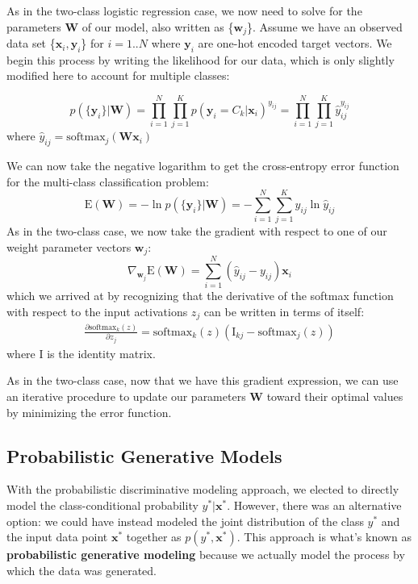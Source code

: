 As in the two-class logistic regression case, we now need to solve for the parameters \textbf{W} of our model, also written as \{$\textbf{w}_{j}$\}. Assume we have an observed data set \{$\textbf{x}_{i}, \textbf{y}_{i}$\} for $i=1..N$ where $\textbf{y}_{i}$ are one-hot encoded target vectors.  We begin this process by writing the likelihood for our data, which is only slightly modified here to account for multiple classes:

\begin{equation} \label{multi-class-log-reg-likelihood}
	p(\{\textbf{y}_{i}\}|\textbf{W}) = \prod_{i=1}^{N}\prod_{j=1}^{K} p(\textbf{y}_{i}=C_{k}|\textbf{x}_{i})^{y_{ij}} = \prod_{i=1}^{N}\prod_{j=1}^{K} \hat{y}_{ij}^{y_{ij}}
\end{equation}
where $\hat{y}_{ij} = \text{softmax}_{j}(\textbf{W}\textbf{x}_{i})$ \newline

We can now take the negative logarithm to get the cross-entropy error function for the multi-class classification problem:
\begin{equation} \label{multi-class-cross-entropy-error-fn}
	\mathrm{E}(\textbf{W}) = - \ln{p(\{\textbf{y}_{i}\}|\textbf{W})} = - \sum_{i=1}^{N}\sum_{j=1}^{K} y_{ij} \ln{\hat{y}_{ij}}
\end{equation}
As in the two-class case, we now take the gradient with respect to one of our weight parameter vectors $\textbf{w}_{j}$:
\begin{equation} \label{multi-class-log-reg-gradient}
	\nabla_{\textbf{w}_{j}} \mathrm{E}(\textbf{W}) = \sum_{i=1}^{N}(\hat{y}_{ij} - y_{ij})\textbf{x}_{i}
\end{equation}
which we arrived at by recognizing that the derivative of the softmax function with respect to the input activations $z_{j}$ can be written in terms of itself:
\begin{align*}
	\frac{\partial \text{softmax}_{k}(z)}{\partial z_{j}} = \text{softmax}_{k}(z)(\mathrm{I}_{kj} - \text{softmax}_{j}(z))
\end{align*}
where $\mathrm{I}$ is the identity matrix.

As in the two-class case, now that we have this gradient expression, we can use an iterative procedure to update our parameters $\textbf{W}$ toward their optimal values by minimizing the error function.

\subsection{Probabilistic Generative Models}
With the probabilistic discriminative modeling approach, we elected to directly model the class-conditional probability $y^{*}|\textbf{x}^{*}$. However, there was an alternative option: we could have instead modeled the joint distribution of the class $y^{*}$ and the input data point $\textbf{x}^{*}$ together as $p(y^{*}, \textbf{x}^{*})$. This approach is what's known as \textbf{probabilistic generative modeling} because we actually model the process by which the data was generated.


